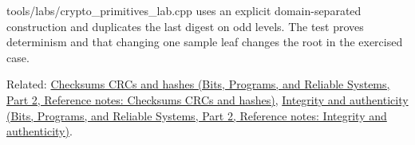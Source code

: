 tools/labs/crypto\_primitives\_lab.cpp uses an explicit domain-separated construction and duplicates the last digest on odd levels. The test proves determinism and that changing one sample leaf changes the root in the exercised case.

Related: \href{../01-Bits-Programs-and-Reliable-Systems-P02/main.pdf\#nameddest=appendix-ed338677de0a}{Checksums CRCs and hashes (Bits, Programs, and Reliable Systems, Part 2, Reference notes: Checksums CRCs and hashes)}, \href{../01-Bits-Programs-and-Reliable-Systems-P02/main.pdf\#nameddest=appendix-cbe594d1ab0a}{Integrity and authenticity (Bits, Programs, and Reliable Systems, Part 2, Reference notes: Integrity and authenticity)}.
